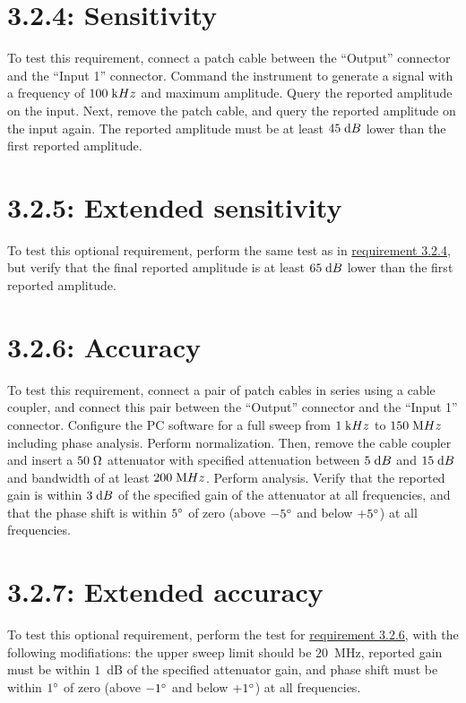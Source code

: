 \section*{3.2.4: Sensitivity}
\label{tp:3.2.4}
To test this requirement, connect a patch cable between the ``Output'' connector and
the ``Input 1'' connector. Command the instrument to generate a signal with a frequency of
$100\;\mathrm{k}Hz$ and maximum amplitude. Query the reported amplitude on the input. Next,
remove the patch cable, and query the reported amplitude on the input again. The reported
amplitude must be at least $45\;\mathrm{d}B$ lower than the first reported amplitude.

\section*{3.2.5: Extended sensitivity}
To test this optional requirement, perform the same test as in \hyperref[tp:3.2.4]{requirement 3.2.4},
but verify that the final reported amplitude is at least $65\;\mathrm{d}B$ lower than the first reported amplitude.

\section*{3.2.6: Accuracy}
\label{tp:3.2.6}
To test this requirement, connect a pair of patch cables in series using a cable coupler,
and connect this pair between the ``Output'' connector and the ``Input 1'' connector. Configure
the PC software for a full sweep from $1\;\mathrm{k}Hz$ to $150\;\mathrm{M}Hz$ including phase analysis.
Perform normalization. Then, remove the cable coupler and insert a $50\;\mathrm{\Omega}$ attenuator with
specified attenuation between $5\;\mathrm{d}B$ and $15\;\mathrm{d}B$ and bandwidth of at least $200\;\mathrm{M}Hz$.
Perform analysis. Verify that the reported gain is within $3\;\mathrm{d}B$ of the specified gain of the
attenuator at all frequencies, and that the phase shift is within $5{}^\circ$ of zero
(above $-5{}^\circ$ and below $+5{}^\circ$) at all frequencies.

\section*{3.2.7: Extended accuracy}
To test this optional requirement, perform the test for \hyperref[tp:3.2.6]{requirement 3.2.6},
with the following modifiations: the upper sweep limit should be $20$~MHz, reported gain must be
within $1$~dB of the specified attenuator gain, and phase shift must be within $1{}^\circ$ of zero
(above $-1{}^\circ$ and below $+1{}^\circ$) at all frequencies.

